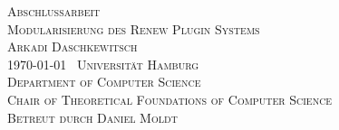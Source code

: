 \begin{titlepage}	
\vspace*{100px}

\begin{center}
	\vspace{5em}
	{\Large \textsc{Abschlussarbeit}}\\
	\vspace{5em}
	{\huge \textsc{Modularisierung des \textsc{Renew} Plugin Systems}}\\
	\vspace{4em}
	{\Large \textsc{Arkadi Daschkewitsch}}\\
	\vspace{3em}
	{\Large \textsc{\today}}\
	\vspace{3em}
	{\Large \textsc{Universität Hamburg}}\\
	\vspace{1em}
	{\Large \textsc{Department of Computer Science}}\\
	\vspace{1em}
	{\Large \textsc{Chair of Theoretical Foundations of Computer Science}}\\
	\vspace{2em}
	{\Large \textsc{Betreut durch Daniel Moldt}}\\
\end{center}
\end{titlepage}